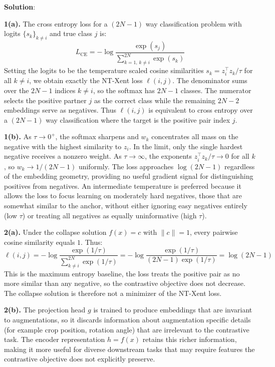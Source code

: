 \documentclass[submit]{../harvardml}
\newenvironment{solution}{%
    \vspace{2mm}\color{blue}\noindent\textbf{Solution}:\ }
{}
\begin{document}
\begin{solution}

\textbf{1(a).} The cross entropy loss for a $(2N{-}1)$ way classification problem with logits $\{s_k\}_{k \neq i}$ and true class $j$ is:
\[
L_{\mathrm{CE}} = -\log \frac{\exp(s_j)}{\sum_{k=1,\,k \neq i}^{2N} \exp(s_k)}
\]
Setting the logits to be the temperature scaled cosine similarities $s_k = z_i^\top z_k / \tau$ for all $k \neq i$, we obtain exactly the NT-Xent loss $\ell(i,j)$. The denominator sums over the $2N - 1$ indices $k \neq i$, so the softmax has $2N - 1$ classes. The numerator selects the positive partner $j$ as the correct class while the remaining $2N - 2$ embeddings serve as negatives. Thus $\ell(i,j)$ is equivalent to cross entropy over a $(2N{-}1)$ way classification where the target is the positive pair index $j$.

\textbf{1(b).} As $\tau \to 0^+$, the softmax sharpens and $w_k$ concentrates all mass on the negative with the highest similarity to $z_i$. In the limit, only the single hardest negative receives a nonzero weight. As $\tau \to \infty$, the exponents $z_i^\top z_k / \tau \to 0$ for all $k$, so $w_k \to 1/(2N-1)$ uniformly. The loss approaches $\log(2N-1)$ regardless of the embedding geometry, providing no useful gradient signal for distinguishing positives from negatives. An intermediate temperature is preferred because it allows the loss to focus learning on moderately hard negatives, those that are somewhat similar to the anchor, without either ignoring easy negatives entirely (low $\tau$) or treating all negatives as equally uninformative (high $\tau$).

\textbf{2(a).} Under the collapse solution $f(x) = c$ with $\|c\| = 1$, every pairwise cosine similarity equals $1$. Thus:
\[
\ell(i,j) = -\log \frac{\exp(1/\tau)}{\sum_{k \neq i}^{2N} \exp(1/\tau)} = -\log \frac{\exp(1/\tau)}{(2N-1)\exp(1/\tau)} = \log(2N-1)
\]
This is the maximum entropy baseline, the loss treats the positive pair as no more similar than any negative, so the contrastive objective does not decrease. The collapse solution is therefore not a minimizer of the NT-Xent loss.

\textbf{2(b).} The projection head $g$ is trained to produce embeddings that are invariant to augmentations, so it discards information about augmentation specific details (for example crop position, rotation angle) that are irrelevant to the contrastive task. The encoder representation $h = f(x)$ retains this richer information, making it more useful for diverse downstream tasks that may require features the contrastive objective does not explicitly preserve.


\end{solution}
\end{document}
